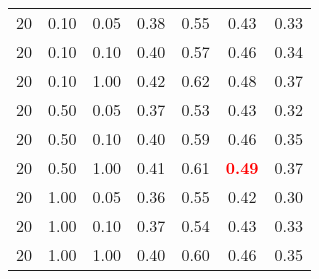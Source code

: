 \begin{tabular}{lllcccc}
20 & 0.10 & 0.05 & 0.38 & 0.55 & 0.43 & 0.33 \\ 
20 & 0.10 & 0.10 & 0.40 & 0.57 & 0.46 & 0.34 \\ 
20 & 0.10 & 1.00 & 0.42 & 0.62 & 0.48 & 0.37 \\ 
20 & 0.50 & 0.05 & 0.37 & 0.53 & 0.43 & 0.32 \\ 
20 & 0.50 & 0.10 & 0.40 & 0.59 & 0.46 & 0.35 \\ 
20 & 0.50 & 1.00 & 0.41 & 0.61 & \textbf{\textcolor{red}{0.49}} & 0.37 \\ 
20 & 1.00 & 0.05 & 0.36 & 0.55 & 0.42 & 0.30 \\ 
20 & 1.00 & 0.10 & 0.37 & 0.54 & 0.43 & 0.33 \\ 
20 & 1.00 & 1.00 & 0.40 & 0.60 & 0.46 & 0.35 \\ 
\end{tabular} 
